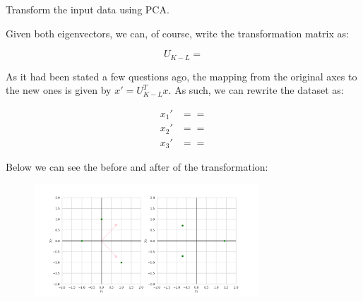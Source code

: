 \documentclass[12pt]{article}
\begin{document}
\begin{enumerate}[leftmargin=\labelsep]
\begin{tcolorbox}[enhanced jigsaw,halign=center,colback=bg,boxrule=0pt,arc=1pt]
    Transform the input data using PCA.

  \end{tcolorbox}

  Given both eigenvectors, we can, of course, write the transformation matrix
  as:

  \begin{equation*}
    U_{K-L} = 
  \end{equation*}

  As it had been stated a few questions ago, the mapping from the original
  axes to the new ones is given by $x' = U_{K-L}^T x$. As such, we can
  rewrite the dataset as:

  \begin{equation*}
    \begin{aligned}
      x_1' & =   =  \\
      x_2' & =   =  \\
      x_3' & =   = 
    \end{aligned}
  \end{equation*}

  Below we can see the before and after of the transformation:

  \begin{figure}[h]
    \centering
    \includegraphics[width=0.75\textwidth]{assets/ex-5/samples.png}
    \label{fig:samples-5}
  \end{figure}


\end{enumerate}
\end{document}
